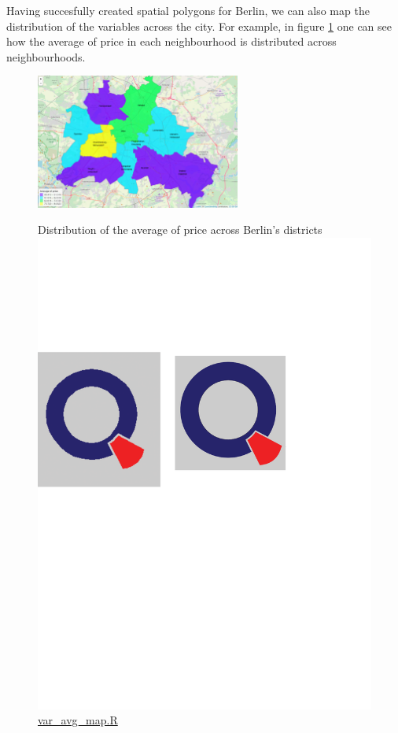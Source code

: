 Having succesfully created spatial polygons for Berlin, we can also map the distribution of the variables across the city. For example, in figure \ref{figure:priceavg} one can see how the average of price in each neighbourhood is distributed across neighbourhoods.

\begin{figure}[H]
\begin{center}
\includegraphics[width=0.6\textwidth, keepaspectratio]{price_avg_map.png} \\
\caption{Distribution of the average of price across Berlin's districts \protect\includegraphics[scale=0.05]{qletlogo.pdf} {\href{https://github.com/silvia-ventoruzzo/SPL-WISE-2018/blob/master/Helpers/var_avg_map.R}{var\_avg\_map.R}}}
\label{figure:priceavg}
\end{center}
\end{figure}